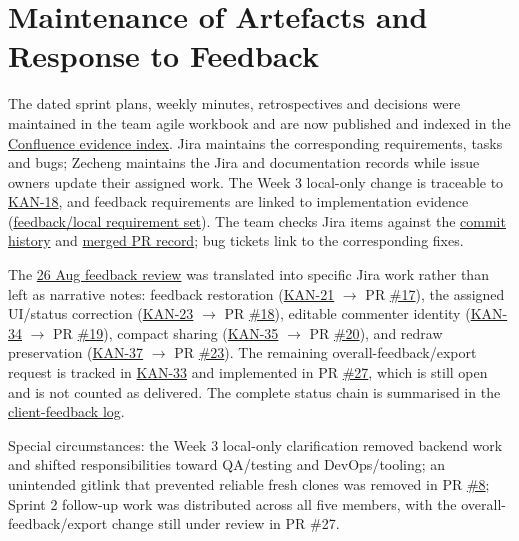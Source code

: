 \documentclass[10pt,a4paper]{article}
\newcommand{\ghbase}{https://github.com/lkevincc0/mm-local-editor}
\newcommand{\PR}[1]{\href{\ghbase/pull/#1}{\##1}}
\newcommand{\jirabase}{https://student-team-zvzgb5e3.atlassian.net}
\newcommand{\JIRA}[1]{\href{\jirabase/browse/KAN-#1}{KAN-#1}}
\newcommand{\wikibase}{https://student-team-zvzgb5e3.atlassian.net/wiki/spaces/~7120206e0163ea5d37428b992775145124d7e8/pages/}
\newcommand{\wpage}[2]{\href{\wikibase#1}{#2}}
\begin{document}
\section{Maintenance of Artefacts and Response to Feedback}

The dated sprint plans, weekly minutes, retrospectives and decisions were maintained in the team agile workbook and are now published and indexed in the \wpage{458754}{Confluence evidence index}. Jira maintains the corresponding requirements, tasks and bugs; Zecheng maintains the Jira and documentation records while issue owners update their assigned work. The Week 3 local-only change is traceable to \JIRA{18}, and feedback requirements are linked to implementation evidence (\href{\jirabase/issues/?jql=key\%20in\%20\%28KAN-12\%2CKAN-13\%2CKAN-14\%2CKAN-15\%2CKAN-16\%2CKAN-18\%2CKAN-21\%2CKAN-34\%29\%20ORDER\%20BY\%20key\%20ASC}{feedback/local requirement set}). The team checks Jira items against the \href{\ghbase/commits/develop}{commit history} and \href{\ghbase/pulls?q=is\%3Apr+is\%3Amerged}{merged PR record}; bug tickets link to the corresponding fixes.

The \wpage{557269}{26 Aug feedback review} was translated into specific Jira work rather than left as narrative notes: feedback restoration (\JIRA{21} $\rightarrow$ PR \PR{17}), the assigned UI/status correction (\JIRA{23} $\rightarrow$ PR \PR{18}), editable commenter identity (\JIRA{34} $\rightarrow$ PR \PR{19}), compact sharing (\JIRA{35} $\rightarrow$ PR \PR{20}), and redraw preservation (\JIRA{37} $\rightarrow$ PR \PR{23}). The remaining overall-feedback/export request is tracked in \JIRA{33} and implemented in PR \PR{27}, which is still open and is not counted as delivered. The complete status chain is summarised in the \wpage{524330}{client-feedback log}.

Special circumstances: the Week 3 local-only clarification removed backend work and shifted responsibilities toward QA/testing and DevOps/tooling; an unintended gitlink that prevented reliable fresh clones was removed in PR \PR{8}; Sprint 2 follow-up work was distributed across all five members, with the overall-feedback/export change still under review in PR \#27.
\end{document}
